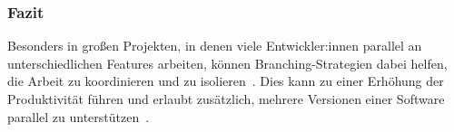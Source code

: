 \subsubsection{Fazit}

Besonders in großen Projekten, in denen viele Entwickler:innen parallel an unterschiedlichen Features arbeiten, können Branching\hyp Strategien dabei helfen, die Arbeit zu koordinieren und zu isolieren~\cite{hart_besten_2020}. Dies kann zu einer Erhöhung der Produktivität führen und erlaubt zusätzlich, mehrere Versionen einer Software parallel zu unterstützen~\cite{hart_besten_2020}.

